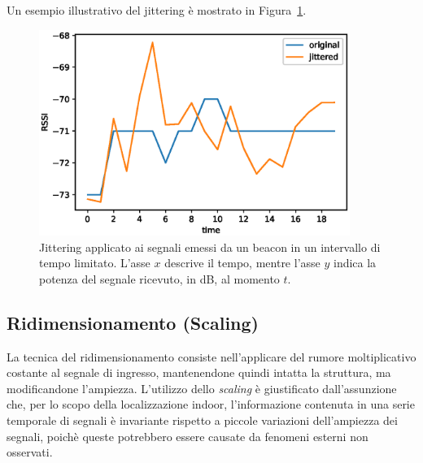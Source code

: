 Un esempio illustrativo del jittering è mostrato in Figura~\ref{fig:jitter}.
\begin{figure}[!htp]
  \centering\includegraphics[width=0.9\textwidth]{./img/jittering.eps}
  \caption{Jittering applicato ai segnali emessi da un beacon in un intervallo
    di tempo limitato. L'asse \(x\) descrive il tempo, mentre l'asse \(y\)
    indica la potenza del segnale ricevuto, in dB, al momento \(t\).}%
  \label{fig:jitter}%
\end{figure}

\subsection{Ridimensionamento (Scaling)}
La tecnica del ridimensionamento consiste nell'applicare del rumore
moltiplicativo costante al segnale di ingresso, mantenendone quindi intatta la
struttura, ma modificandone l'ampiezza. L'utilizzo dello \emph{scaling} è
giustificato dall'assunzione che, per lo scopo della localizzazione indoor,
l'informazione contenuta in una serie temporale di segnali è invariante
rispetto a piccole variazioni dell'ampiezza dei segnali, poichè queste
potrebbero essere causate da fenomeni esterni non osservati.

